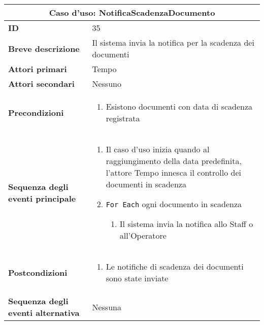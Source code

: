 \documentclass[a4paper]{report}
\begin{document}
\clearpage
\begin{table}[H]
\vspace*{-0cm}
\renewcommand{\arraystretch}{1.9}
\begin{tabular}{|p{3.9cm}|p{9.9cm}|}
\hline
\multicolumn{2}{|c|}{\textbf{Caso d’uso: NotificaScadenzaDocumento}} \\ \hline
	\textbf{ID} & 35 \\ \hline
	\textbf{Breve descrizione} & Il sistema invia la notifica per la scadenza dei documenti \\ \hline
	\textbf{Attori primari} & Tempo \\ \hline
	\textbf{Attori secondari} & Nessuno \\ \hline
	\textbf{Precondizioni} & \begin{enumerate}[leftmargin=14pt,label=\arabic*.,labelsep=0.5em,topsep=0pt,partopsep=0pt,parsep=0pt,itemsep=0pt]
        \item Esistono documenti con data di scadenza registrata
    \end{enumerate} \\ \hline
	\textbf{Sequenza degli eventi principale} & 
\begin{enumerate}[leftmargin=14pt,label=\arabic*.,labelsep=0.5em,topsep=0pt,partopsep=0pt,parsep=0pt,itemsep=0pt]
    \item Il caso d’uso inizia quando al raggiungimento della data predefinita, l’attore Tempo innesca il controllo dei documenti in scadenza
    \item \texttt{For Each} ogni documento in scadenza
    \begin{enumerate}[label=\arabic{enumi}.\arabic*.,leftmargin=22pt,labelsep=0.5em,topsep=0pt,partopsep=0pt,parsep=0pt,itemsep=0pt]
        \item Il sistema invia la notifica allo Staff o all’Operatore
    \end{enumerate}
\end{enumerate}\\ \hline
	\textbf{Postcondizioni} & \begin{enumerate}[label=\arabic*.,leftmargin=14pt,labelsep=0.5em,topsep=0pt,partopsep=0pt,parsep=0pt,itemsep=0pt]
        \item Le notifiche di scadenza dei documenti sono state inviate
    \end{enumerate} \\ \hline
	\textbf{Sequenza degli eventi alternativa} & Nessuna \\ \hline
\end{tabular}
\end{table}
\end{document}
